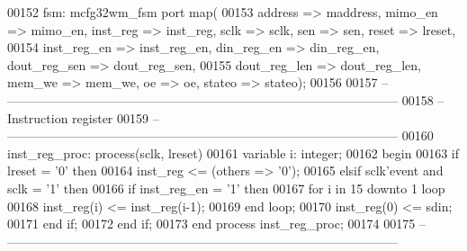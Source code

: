 \begin{DoxyCode}
00152     fsm: mcfg32wm_fsm \textcolor{keywordflow}{port} \textcolor{keywordflow}{map}( 
00153         address => maddress, mimo_en => mimo_en, inst_reg => inst_reg, sclk => 
      sclk, sen => sen, reset => lreset,
00154         inst_reg_en => inst_reg_en, din_reg_en => din_reg_en, dout_reg_sen => 
      dout_reg_sen,
00155         dout_reg_len => dout_reg_len, mem_we => mem_we, oe => oe, stateo => 
      stateo\textcolor{vhdlchar}{)};
00156         
00157 \textcolor{keyword}{    -- ---------------------------------------------------------------------------------------------}
00158 \textcolor{keyword}{    -- Instruction register}
00159 \textcolor{keyword}{    -- ---------------------------------------------------------------------------------------------}
00160     inst\_reg\_proc: \textcolor{keywordflow}{process}(sclk, lreset)
00161         \textcolor{keywordflow}{variable} \textcolor{vhdlchar}{i}\textcolor{vhdlchar}{:} \textcolor{comment}{integer};
00162 \textcolor{vhdlkeyword}{    begin}
00163         \textcolor{keywordflow}{if} \textcolor{vhdlchar}{lreset} \textcolor{vhdlchar}{=} \textcolor{vhdlchar}{'}\textcolor{vhdllogic}{}\textcolor{vhdllogic}{0}\textcolor{vhdlchar}{'} \textcolor{keywordflow}{then}
00164             inst\_reg <= (\textcolor{keywordflow}{others} => '0');
00165         \textcolor{keywordflow}{elsif} \textcolor{vhdlchar}{sclk}\textcolor{vhdlchar}{'}\textcolor{vhdlkeyword}{event} \textcolor{keywordflow}{and} \textcolor{vhdlchar}{sclk} \textcolor{vhdlchar}{=} \textcolor{vhdlchar}{'}\textcolor{vhdllogic}{}\textcolor{vhdllogic}{1}\textcolor{vhdlchar}{'} \textcolor{keywordflow}{then}
00166             \textcolor{keywordflow}{if} \textcolor{vhdlchar}{inst_reg_en} \textcolor{vhdlchar}{=} \textcolor{vhdlchar}{'}\textcolor{vhdllogic}{}\textcolor{vhdllogic}{1}\textcolor{vhdlchar}{'} \textcolor{keywordflow}{then}
00167                 \textcolor{keywordflow}{for} \textcolor{vhdlchar}{i} \textcolor{keywordflow}{in} \textcolor{vhdllogic}{}\textcolor{vhdllogic}{15} \textcolor{keywordflow}{downto} \textcolor{vhdllogic}{}\textcolor{vhdllogic}{1} \textcolor{keywordflow}{loop}
00168                     inst\_reg(i) <= inst\_reg(i-1);
00169                 \textcolor{keywordflow}{end} \textcolor{keywordflow}{loop};
00170                 inst\_reg(\textcolor{vhdllogic}{0}) <= sdin;
00171             \textcolor{keywordflow}{end} \textcolor{keywordflow}{if};
00172         \textcolor{keywordflow}{end} \textcolor{keywordflow}{if};
00173     \textcolor{keywordflow}{end} \textcolor{keywordflow}{process} \textcolor{vhdlchar}{inst\_reg\_proc};
00174 
00175 \textcolor{keyword}{    -- ---------------------------------------------------------------------------------------------}

\end{DoxyCode}
